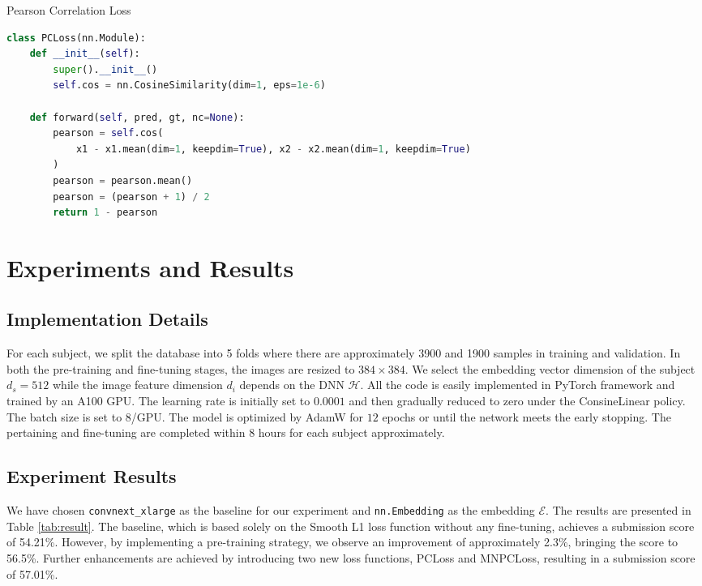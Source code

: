 \documentclass{article}
\begin{document}
\begin{algorithm}[!ht]
   \caption{Pearson Correlation Loss}
   \label{algo:pcc_loss}
\begin{lstlisting}[language=python]
class PCLoss(nn.Module):
    def __init__(self):
        super().__init__()
        self.cos = nn.CosineSimilarity(dim=1, eps=1e-6)

    def forward(self, pred, gt, nc=None):
        pearson = self.cos(
            x1 - x1.mean(dim=1, keepdim=True), x2 - x2.mean(dim=1, keepdim=True)
        )
        pearson = pearson.mean()
        pearson = (pearson + 1) / 2
        return 1 - pearson
\end{lstlisting}
\end{algorithm}

\section{Experiments and Results}
\subsection{Implementation Details}
For each subject, we split the database into 5 folds where there are approximately 3900 and 1900 samples in training and validation. In both the pre-training and fine-tuning stages, the images are resized to $384 \times 384$. We select the embedding vector dimension of the subject $d_s = 512$ while the image feature dimension $d_i$ depends on the DNN $\mathcal{H}$. All the code is easily implemented in PyTorch framework and trained by an A100 GPU. The learning rate is initially set to $0.0001$ and then gradually reduced to zero under the ConsineLinear \cite{cosinelr} policy. The batch size is set to $8$/GPU. The model is optimized by AdamW \cite{adamw} for $12$ epochs or until the network meets the early stopping. The pertaining and fine-tuning are completed within 8 hours for each subject approximately.

\subsection{Experiment Results}
We have chosen \texttt{convnext\_xlarge} \cite{liu2022convnet} as the baseline for our experiment and \texttt{nn.Embedding} as the embedding $\mathcal{E}$. The results are presented in Table \ref{tab:result}. The baseline, which is based solely on the Smooth L1 loss function without any fine-tuning, achieves a submission score of 54.21\%. However, by implementing a pre-training strategy, we observe an improvement of approximately 2.3\%, bringing the score to 56.5\%. Further enhancements are achieved by introducing two new loss functions, PCLoss and MNPCLoss, resulting in a submission score of 57.01\%.
\end{document}
